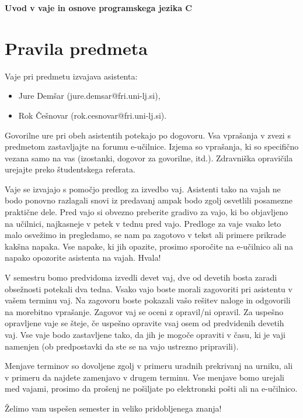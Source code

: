 \documentclass[12pt,letterpaper]{article}
\begin{document}
\begin{center}
    \textbf{\Large Uvod v vaje in osnove programskega jezika C}   
\end{center}


\section*{Pravila predmeta}

Vaje pri predmetu izvajava asistenta:
\begin{itemize}
    \item Jure Demšar (jure.demsar@fri.uni-lj.si),
    \item Rok Češnovar (rok.cesnovar@fri.uni-lj.si).
\end{itemize}

Govorilne ure pri obeh asistentih potekajo po dogovoru. Vsa vprašanja v zvezi s predmetom zastavljajte na forumu e-učilnice. Izjema so vprašanja, ki so specifično vezana samo na vas (izostanki, dogovor za govorilne, itd.). Zdravniška opravičila urejajte preko študentskega referata.

Vaje se izvajajo s pomočjo predlog za izvedbo vaj. Asistenti tako na vajah ne bodo ponovno razlagali snovi iz predavanj ampak bodo zgolj osvetlili posamezne praktične dele. Pred vajo si obvezno preberite gradivo za vajo, ki bo objavljeno na učilnici, najkasneje v petek v tednu pred vajo. Predloge za vaje vsako leto malo osvežimo in pregledamo, se nam pa zagotovo v tekst ali primere prikrade kakšna napaka. Vse napake, ki jih opazite, prosimo sporočite na e-učilnico ali na napako opozorite asistenta na vajah. Hvala!

V semestru bomo predvidoma izvedli devet vaj, dve od devetih bosta zaradi obsežnosti potekali dva tedna. Vsako vajo boste morali zagovoriti pri asistentu v vašem terminu vaj. Na zagovoru boste pokazali vašo rešitev naloge in odgovorili na morebitno vprašanje. Zagovor vaj se oceni z opravil/ni opravil. Za uspešno opravljene vaje se šteje, če uspešno opravite vsaj osem od predvidenih devetih vaj. Vse vaje bodo zastavljene tako, da jih je mogoče opraviti v času, ki je vaji namenjen (ob predpostavki da ste se na vajo ustrezno pripravili).

Menjave terminov so dovoljene zgolj v primeru uradnih prekrivanj na urniku, ali v primeru da najdete zamenjavo v drugem terminu. Vse menjave bomo urejali med vajami, prosimo da prošenj ne pošiljate po elektronski pošti ali na e-učilnico.

Želimo vam uspešen semester in veliko pridobljenega znanja!
\end{document}
